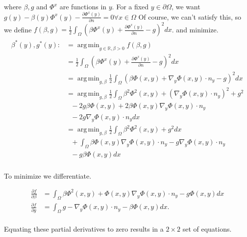 \documentclass[paper=a4, fontsize=11pt]{scrartcl} %
\DeclareMathOperator*{\argmin}{arg\,min}
\numberwithin{equation}{section} %
\numberwithin{figure}{section} %
\numberwithin{table}{section} %
\begin{document}
where $\beta, g$ and $\Phi^{x}$ are functions in $y$. For a fixed $y \in \partial \Omega$, we want $g(y) - \beta (y) \Phi^{x}(y) - \frac{\partial \Phi^{x}(y)}{\partial n} =0 \forall x \in \Omega$
Of course, we can't satisfy this, so we define
 $f(\beta, g) =\frac{1}{2} \int_{\Omega} ( \beta \Phi^{x}(y) + \frac{\partial \Phi^{x}(y)}{\partial n} - g)^{2} dx$.
and minimize.
\begin{align}
  \begin{split}
    \beta^{*}(y), g^{*}(y) :&= \argmin_{g \in \mathbb{R}, \beta > 0} f(\beta,g ) \\
    &=\frac{1}{2} \int_{\Omega} ( \beta \Phi^{x}(y) + \frac{\partial \Phi^{x}(y)}{\partial n} - g)^{2} dx \\
    &= \argmin_{g, \beta } \frac{1}{2} \int_{\Omega} ( \beta \Phi(x,y) + \nabla_{y} \Phi(x,y) \cdot n_{y} - g)^{2} dx\\
    &= \argmin_{g, \beta } \frac{1}{2} \int_{\Omega} \beta^2 \Phi^2(x,y) + (\nabla_{y} \Phi(x,y) \cdot n_{y})^2 + g^2\\
    &\ \ \ - 2g\beta\Phi(x,y) + 2\beta \Phi(x,y)\nabla_{y} \Phi(x,y) \cdot n_{y} \\
    &\ \ \ - 2g\nabla_{y} \Phi(x,y) \cdot n_{y} dx \\
    &= \argmin_{g, \beta } \frac{1}{2} \int_{\Omega} \beta^2 \Phi^2(x,y) +  g^2dx\\
    &\ \ \ + \int_{\Omega} \beta \Phi(x,y)\nabla_{y} \Phi(x,y) \cdot n_{y} -g\nabla_{y} \Phi(x,y) \cdot n_{y}\\
    &\ \ \ -g\beta\Phi(x,y) dx \\
  \end{split}
\end{align}

To minimize we differentiate.

\begin{align*}
  \frac{\partial f}{\partial \beta} &= \int_{\Omega} \beta\Phi^2(x,y) + \Phi(x,y)\nabla_{y} \Phi(x,y) \cdot n_{y} -g\Phi(x,y) dx\\
  \frac{\partial f}{\partial g} &= \int_{\Omega} g - \nabla_{y} \Phi(x,y) \cdot n_{y} -\beta\Phi(x,y) dx. \\
\end{align*}

Equating these partial derivatives to zero results in a $2\times 2$ set of equations.
\end{document}
